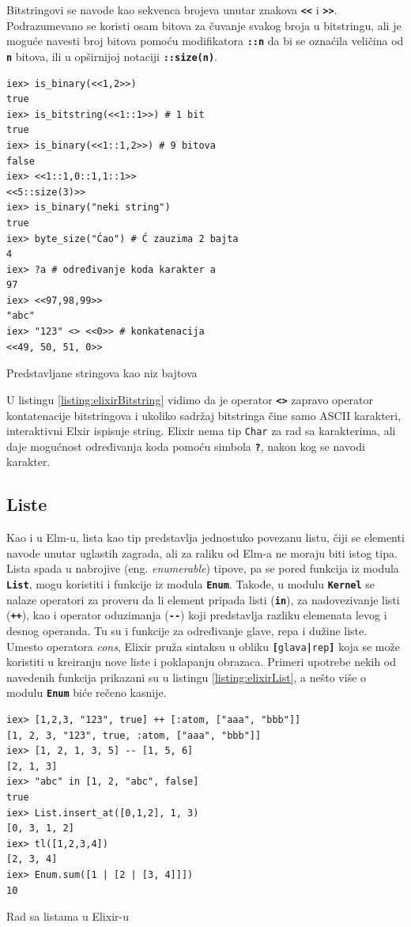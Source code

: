 \documentclass[12pt,oneside]{memoir}
\begin{document}
Bitstringovi se navode kao sekvenca brojeva unutar znakova
\texttt{\textbf{<\smallskip<}} i \texttt{\textbf{>\smallskip>}}. Podrazumevano se koristi
osam bitova za čuvanje svakog broja u bitstringu, ali je moguće navesti broj bitova pomoću
modifikatora \texttt{\textbf{::n}} da bi se oznaćila veličina od \texttt{\textbf{n}} bitova,
ili u opširnijoj notaciji \texttt{\textbf{::size(n)}}.
\begin{listing}[!h]
\begin{verbatim}
iex> is_binary(<<1,2>>)
true
iex> is_bitstring(<<1::1>>) # 1 bit
true
iex> is_binary(<<1::1,2>>) # 9 bitova
false
iex> <<1::1,0::1,1::1>>
<<5::size(3)>>
iex> is_binary("neki string")
true
iex> byte_size("Ćao") # Ć zauzima 2 bajta
4
iex> ?a # određivanje koda karakter a
97
iex> <<97,98,99>>  
"abc"
iex> "123" <> <<0>> # konkatenacija
<<49, 50, 51, 0>>
\end{verbatim}
\caption{Predstavljane stringova kao niz bajtova}
\label{listing:elixirBitstring}
\end{listing}
U listingu \ref{listing:elixirBitstring} vidimo da je operator \texttt{\textbf{<>}} zapravo
operator kontatenacije bitstringova i ukoliko sadržaj bitstringa čine samo ASCII
karakteri, interaktivni Elxir ispisuje string. Elixir nema tip \texttt{Char} za rad sa
karakterima, ali daje mogućnost određivanja koda pomoću simbola \texttt{\textbf{?}}, nakon 
kog se navodi karakter. 

\subsection{Liste}
Kao i u Elm-u, lista kao tip predstavlja jednostuko povezanu listu, čiji se elementi navode
unutar uglastih zagrada, ali za raliku od Elm-a ne moraju biti istog tipa. Lista spada u 
nabrojive (eng. \emph{enumerable}) tipove, pa se pored funkcija iz modula \texttt{\textbf{List}},
mogu koristiti i funkcije iz modula \texttt{\textbf{Enum}}. Takođe, u modulu \texttt{\textbf{Kernel}}
se nalaze operatori za proveru da li element pripada listi (\texttt{\textbf{in}}), za nadovezivanje
listi (\texttt{\textbf{++}}), kao i operator oduzimanja (\texttt{\textbf{-{}-}}) koji predstavlja
razliku elemenata levog i desnog operanda. Tu su i funkcije za određivanje
glave, repa i dužine liste. Umesto operatora \emph{cons}, Elixir pruža sintaksu u obliku
\texttt{\textbf{[}glava\textbf{|}rep\textbf{]}} koja se može koristiti u kreiranju nove
liste i poklapanju obrazaca. Primeri upotrebe nekih od navedenih funkcija prikazani su u
listingu \ref{listing:elixirList}, a nešto više o modulu \texttt{\textbf{Enum}} biće rečeno kasnije. 
\begin{listing}[h]
\begin{verbatim}
iex> [1,2,3, "123", true] ++ [:atom, ["aaa", "bbb"]]
[1, 2, 3, "123", true, :atom, ["aaa", "bbb"]]
iex> [1, 2, 1, 3, 5] -- [1, 5, 6]
[2, 1, 3]
iex> "abc" in [1, 2, "abc", false]
true
iex> List.insert_at([0,1,2], 1, 3)
[0, 3, 1, 2]
iex> tl([1,2,3,4])
[2, 3, 4]
iex> Enum.sum([1 | [2 | [3, 4]]])
10
\end{verbatim}
\caption{Rad sa listama u Elixir-u}
\label{listing:elixirList}
\end{listing}
\end{document}
